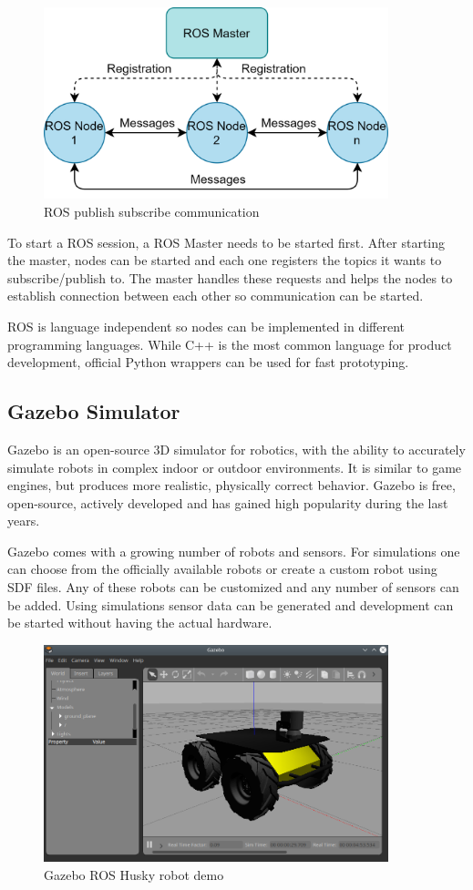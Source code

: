 \begin{figure}[!ht]
    \centering
    \includegraphics[width=100mm, keepaspectratio]{figures/ros_pubsub.png}
    \caption{ROS publish subscribe communication}
    \label{fig:ros_pubsub}
\end{figure}

To start a ROS session, a ROS Master needs to be started first. After starting the master, nodes can be 
started and each one registers the topics it wants to subscribe/publish to. The master handles these requests
and helps the nodes to establish connection between each other so communication can be started. 

ROS is language independent so nodes can be implemented in different programming languages. While C++ is 
the most common language for product development, official Python wrappers can be used for fast 
prototyping.


\subsection{Gazebo Simulator}
Gazebo\cite{GazeboWebsite} is an open-source 3D simulator for robotics, with the ability to accurately simulate robots in complex
indoor or outdoor environments. It is similar to game engines, but produces more realistic, physically correct
behavior. Gazebo is free, open-source, actively developed and has gained high popularity during the last years. 

Gazebo comes with a growing number of robots and sensors. For simulations one can choose from the officially 
available robots or create a custom robot using SDF files. Any of these robots can be customized and any 
number of sensors can be added. Using simulations sensor data can be generated and development can be started 
without having the actual hardware.

\begin{figure}[h]
    \centering
    \includegraphics[width=100mm, keepaspectratio]{figures/husky.png}
    \caption{Gazebo ROS Husky robot demo}
    \label{fig:ros_husky}
\end{figure}

